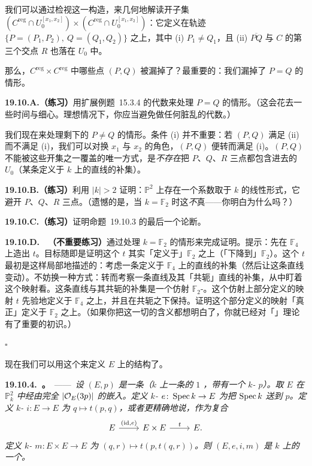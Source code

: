 我们可以通过检视这一构造，来几何地解读开子集 $(C^{\mathrm{reg}}\cap U_0^{[x_1,x_2]})\times(C^{\mathrm{reg}}\cap U_0^{[x_1,x_2]})$：它定义在轨迹 $\{P=(P_1,P_2),\ Q=(Q_1,Q_2)\}$ 之上，其中 (i) $P_1\ne Q_1$，且 (ii) $\overline{PQ}$ 与 $C$ 的第三个交点 $R$ 也落在 $U_0$ 中。

那么，$C^{\mathrm{reg}}\times C^{\mathrm{reg}}$ 中哪些点 $(P,Q)$ 被漏掉了？最重要的：我们漏掉了 $P=Q$ 的情形。

\textbf{19.10.A.（练习）}\quad 用\mbox{扩展例题~15.3.4} 的代数来处理 $P=Q$ 的情形。（这会花去一些时间与细心。理想情况下，你应当避免做任何脏乱的代数。）

我们现在来处理剩下的 $P\ne Q$ 的情形。条件 (i) 并不重要：若 $(P,Q)$ 满足 (ii) 而不满足 (i)，我们可以对换 $x_1$ 与 $x_2$ 的角色，$(P,Q)$ 便转而满足 (i)。$(P,Q)$ 不能被这些开集之一覆盖的唯一方式，是\emph{不存在}把 $P$、$Q$、$R$ 三点都包含进去的 $U_0$（某条定义于 $k$ 上的直线的补集）。

\textbf{19.10.B.（练习）}\quad 利用 $|k|>2$ 证明：$\mathbb{P}^2$ 上存在一个系数取于 $k$ 的线性形式，它避开 $P$、$Q$、$R$ 三点。（遗憾的是，当 $k=\mathbb{F}_2$ 时这\emph{不}真——你明白为什么吗？）

\textbf{19.10.C.（练习）}\quad 证明\mbox{命题~19.10.3} 的最后一个论断。

\textbf{19.10.D.}\ \extrahard\ \textbf{（不重要练习）}\quad 通过处理 $k=\mathbb{F}_2$ 的情形来完成证明。提示：先在 $\mathbb{F}_4$ 上造出\trMorphism{} $t$。目标随即是证明这个 $t$ 其实「定义于」$\mathbb{F}_2$ 之上（「下降到」$\mathbb{F}_2$）。这个\trMorphism{} $t$ 最初是这样局部地描述的：考虑一条定义于 $\mathbb{F}_4$ 上的直线的补集（然后让这条直线变动）。不妨换一种方式：转而考察一条直线及其「共轭」直线的补集，从中盯着这个映射看。这条直线与其共轭的补集是一个仿射 $\mathbb{F}_2$-\trVariety。这个仿射\trVariety{}上部分定义的映射 $t$ 先验地定义于 $\mathbb{F}_4$ 之上，并且在共轭之下保持。证明这个部分定义的映射「真正」定义于 $\mathbb{F}_2$ 之上。（如果你把这一切的含义都想明白了，你就已经对「\trDescent」理论有了重要的初识。）

\begin{flushright}$\square$\end{flushright}

现在我们可以用这个来定义 $E$ 上的\trGroupVariety{}结构了。

\textbf{19.10.4.\ \trhTheorem。}\ ——\ \emph{设 $(E,p)$ 是一条\trEllipticCurve（$k$ 上一条\trRegular{}的\trGenus{} $1$ \trCurve，带有一个 $k$-\trValuedPoint{} $p$）。取 $E$ 在 $\mathbb{P}^2_k$ 中经由完全\trLinearSystem{} $|\mathcal{O}_E(3p)|$ 的嵌入。定义 $k$-\trMorphism{} $e\colon\operatorname{Spec} k\to E$ 为把 $\operatorname{Spec} k$ 送到 $p$。定义 $k$-\trMorphism{} $i\colon E\to E$ 为 $q\mapsto t(p,q)$，或者更精确地说，作为复合}
\[
\begin{tikzcd}
E \ar[r, "{(\id,e)}"] & E\times E \ar[r, "t"] & E.
\end{tikzcd}
\]
\emph{定义 $k$-\trMorphism{} $m\colon E\times E\to E$ 为 $(q,r)\mapsto t(p,t(q,r))$。则 $(E,e,i,m)$ 是 $k$ 上的一个\trGroupVariety。}

